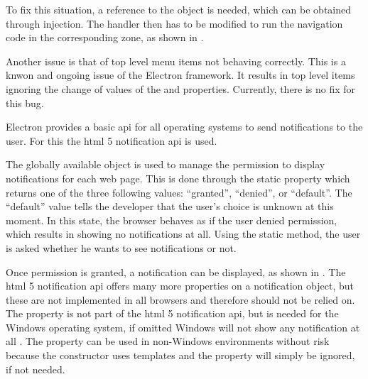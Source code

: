 To fix this situation, a reference to the  object is needed, which can be obtained through injection. The  handler then has to be modified to run the navigation code in the corresponding zone, as shown in .


Another issue is that of top level menu items not behaving correctly. This is a knwon and ongoing issue of the Electron framework. It results in top level items ignoring the change of values of the  and  properties. Currently, there is no fix for this bug. \cite{topMenuItems}


Electron provides a basic \gls{api} for all operating systems to send notifications to the user. For this the \gls{html} 5 notification \gls{api} is used.

The globally available  object is used to manage the permission to display notifications for each web page. This is done through the static  property which returns one of the three following values: \enquote{granted}, \enquote{denied}, or \enquote{default}. The \enquote{default} value tells the developer that the user's choice is unknown at this moment. In this state, the browser behaves as if the user denied permission, which results in showing no notifications at all. Using the static  method, the user is asked whether he wants to see notifications or not.


Once permission is granted, a notification can be displayed, as shown in . The \gls{html} 5 notification \gls{api} offers many more properties on a notification object, but these are not implemented in all browsers and therefore should not be relied on. The  property is not part of the \gls{html} 5 notification \gls{api}, but is needed for the Windows operating system, if omitted Windows will not show any notification at all . The property can be used in non-Windows environments without risk because the constructor uses templates and the property will simply be ignored, if not needed. \cite{mdnNotification}


